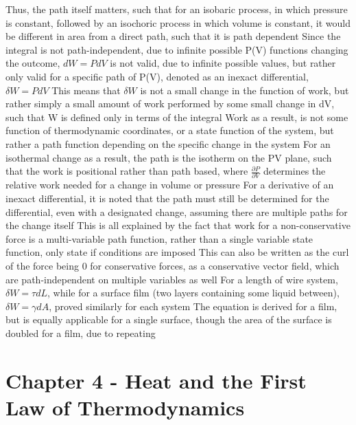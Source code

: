\documentclass[11 pt, twoside]{article}
\newenvironment{outline*}
{
	\begin{outline}[enumerate]
	}
	{\end{outline}
}
\begin{document}
\begin{outline*}
\3 Thus, the path itself matters, such that for an isobaric process, in which pressure is constant, followed by an isochoric process in which volume is constant, it would be different in area from a direct path, such that it is path dependent
\3 Since the integral is not path-independent, due to infinite possible P(V) functions changing the outcome, $dW = PdV$ is not valid, due to infinite possible values, but rather only valid for a  specific path of P(V), denoted as an inexact differential, $\delta W = PdV$
\4 This means that $\delta W$ is not a small change in the function of work, but rather simply a small amount of work performed by some small change in dV, such that W is defined only in terms of the integral
\4 Work as a result, is not some function of thermodynamic coordinates, or a state function of the system, but rather a path function depending on the specific change in the system
\4 For an isothermal change as a result, the path is the isotherm on the PV plane, such that the work is positional rather than path based, where $\frac {\partial P}{\partial V}$ determines the relative work needed for a change in volume or pressure
\4 For a derivative of an inexact differential, it is noted that the path must still be determined for the differential, even with a designated change, assuming there are multiple paths for the change itself
\2 This is all explained by the fact that work for a non-conservative force is a multi-variable path function, rather than a single variable state function, only state if conditions are imposed
\3 This can also be written as the curl of the force being 0 for conservative forces, as a conservative vector field, which are path-independent on multiple variables as well
\1 For a length of wire system, $\delta W = \tau dL$, while for a surface film (two layers containing some liquid between), $\delta W = \gamma dA$, proved similarly for each system
\2 The equation is derived for a film, but is equally applicable for a single surface, though the area of the surface is doubled for a film, due to repeating
\end{outline*}
\section{Chapter 4 - Heat and the First Law of Thermodynamics}
\end{document}
